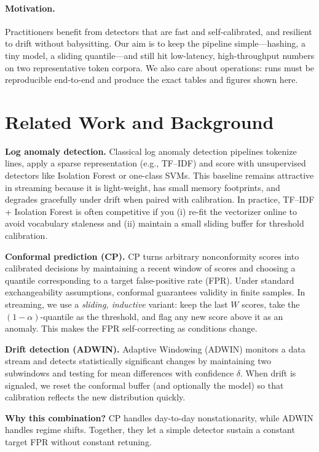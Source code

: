\documentclass[10pt,twocolumn]{article}
\begin{document}
\paragraph{Motivation.} Practitioners benefit from detectors that are fast and self-calibrated, and resilient to drift without babysitting. Our aim is to keep the pipeline simple---hashing, a tiny model, a sliding quantile---and still hit low-latency, high-throughput numbers on two representative token corpora. We also care about operations: runs must be reproducible end-to-end and produce the exact tables and figures shown here.
\section{Related Work and Background}

\textbf{Log anomaly detection.} Classical log anomaly detection pipelines tokenize lines, apply a sparse representation (e.g., TF--IDF) and score with unsupervised detectors like Isolation Forest or one-class SVMs. This baseline remains attractive in streaming because it is light-weight, has small memory footprints, and degrades gracefully under drift when paired with calibration. In practice, TF--IDF + Isolation Forest is often competitive if you (i) re-fit the vectorizer online to avoid vocabulary staleness and (ii) maintain a small sliding buffer for threshold calibration.

\textbf{Conformal prediction (CP).} CP turns arbitrary nonconformity scores into calibrated decisions by maintaining a recent window of scores and choosing a quantile corresponding to a target false-positive rate (FPR). Under standard exchangeability assumptions, conformal guarantees validity in finite samples. In streaming, we use a \emph{sliding, inductive} variant: keep the last $W$ scores, take the $(1{-}\alpha)$-quantile as the threshold, and flag any new score above it as an anomaly. This makes the FPR self-correcting as conditions change.

\textbf{Drift detection (ADWIN).} Adaptive Windowing (ADWIN) monitors a data stream and detects statistically significant changes by maintaining two subwindows and testing for mean differences with confidence $\delta$. When drift is signaled, we reset the conformal buffer (and optionally the model) so that calibration reflects the new distribution quickly.

\noindent \textbf{Why this combination?} CP handles day-to-day nonstationarity, while ADWIN handles regime shifts. Together, they let a simple detector sustain a constant target FPR without constant retuning.
\end{document}
